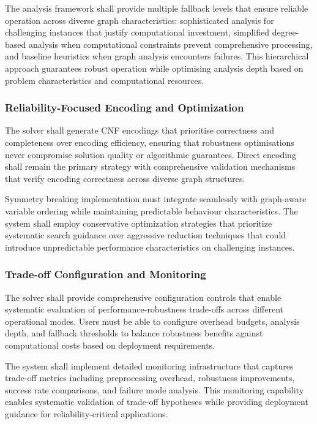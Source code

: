 The analysis framework shall provide multiple fallback levels that ensure reliable operation across diverse graph characteristics: sophisticated analysis for challenging instances that justify computational investment, simplified degree-based analysis when computational constraints prevent comprehensive processing, and baseline heuristics when graph analysis encounters failures. This hierarchical approach guarantees robust operation while optimising analysis depth based on problem characteristics and computational resources.

\subsubsection{Reliability-Focused Encoding and Optimization}
The solver shall generate CNF encodings that prioritise correctness and completeness over encoding efficiency, ensuring that robustness optimisations never compromise solution quality or algorithmic guarantees. Direct encoding shall remain the primary strategy with comprehensive validation mechanisms that verify encoding correctness across diverse graph structures.

Symmetry breaking implementation must integrate seamlessly with graph-aware variable ordering while maintaining predictable behaviour characteristics. The system shall employ conservative optimization strategies that prioritize systematic search guidance over aggressive reduction techniques that could introduce unpredictable performance characteristics on challenging instances.

\subsubsection{Trade-off Configuration and Monitoring}
The solver shall provide comprehensive configuration controls that enable systematic evaluation of performance-robustness trade-offs across different operational modes. Users must be able to configure overhead budgets, analysis depth, and fallback thresholds to balance robustness benefits against computational costs based on deployment requirements.

The system shall implement detailed monitoring infrastructure that captures trade-off metrics including preprocessing overhead, robustness improvements, success rate comparisons, and failure mode analysis. This monitoring capability enables systematic validation of trade-off hypotheses while providing deployment guidance for reliability-critical applications.

